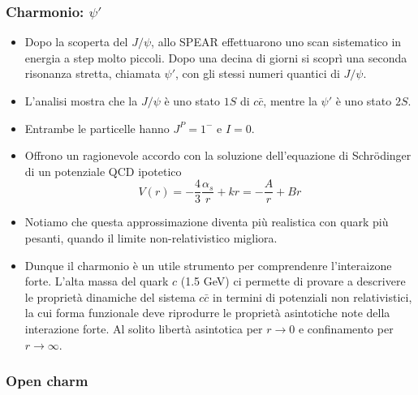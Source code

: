\subsubsection{Charmonio: $\psi'$}
\begin{itemize}
    \item Dopo la scoperta del $J/\psi$, allo SPEAR effettuarono uno scan sistematico in energia a step molto piccoli. Dopo una decina di giorni si scoprì una seconda risonanza stretta, chiamata $\psi'$, con gli stessi numeri quantici di $J/\psi$.
    \item L'analisi mostra che la $J/\psi$ è uno stato $1S$ di $c\bar c$, mentre la $\psi'$ è uno stato $2S$. 
    \item Entrambe le particelle hanno $J^P=1^-$ e $I=0$.
    \item Offrono un ragionevole accordo con la soluzione dell'equazione di Schrödinger di un potenziale QCD ipotetico
    \begin{equation*}
        V(r)=-\frac43\frac{\alpha_s}{r}+kr=-\frac Ar+Br
    \end{equation*}
    \item Notiamo che questa approssimazione diventa più realistica con quark più pesanti, quando il limite non-relativistico migliora. 
    \item Dunque il charmonio è un utile strumento per comprendenre l'interaizone forte. L'alta massa del quark $c$ (1.5 GeV) ci permette di provare a descrivere le proprietà dinamiche del sistema $c\bar c$ in termini di potenziali non relativistici, la cui forma funzionale deve riprodurre le proprietà asintotiche note della interazione forte. Al solito libertà asintotica per $r\to0$ e confinamento per $r\to\infty$.
\end{itemize}
\subsubsection{Open charm}